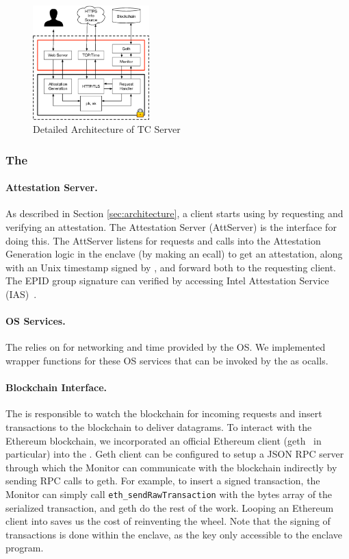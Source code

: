 \begin{figure}[h]
    \centering
    \includegraphics[width=0.4\textwidth]{figures/impl}
    \caption{Detailed Architecture of TC Server}
    \label{fig:tcserver_impl}
\end{figure}

\subsubsection{The \medname}

\paragraph{Attestation Server.} As described in Section \ref{sec:architecture},
a client starts using \tc by requesting and verifying an attestation.  The
Attestation Server (AttServer) is the interface for doing this.  The AttServer
listens for requests and calls into the Attestation Generation logic in the
enclave (by making an ecall) to get an attestation, along with an Unix timestamp
signed by \pkTC, and forward both to the requesting client.  The EPID group
signature can verified by accessing Intel Attestation Service (IAS)~\cite{}. 

\paragraph{OS Services.} The \encname relies on \medname for networking and
time provided by the OS. We implemented wrapper functions for these OS services 
that can be invoked by the \encname as ocalls.

\paragraph{Blockchain Interface.} The \medname is responsible to watch the
blockchain for incoming requests and insert transactions to the blockchain to
deliver datagrams. To interact with the Ethereum blockchain, we incorporated an
official Ethereum client (geth~\cite{geth} in particular) into the \medname.
Geth client can be configured to setup a JSON RPC server through which the
Monitor can communicate with the blockchain indirectly by sending RPC calls to
geth. For example, to insert a signed transaction, the Monitor can simply call
\texttt{eth\_sendRawTransaction} with the bytes array of the serialized
transaction, and geth do the rest of the work. Looping an Ethereum
client into \medname saves us the cost of reinventing the wheel. 
Note that the signing of transactions is done within the enclave, as the key
\pkTC only accessible to the enclave program.

